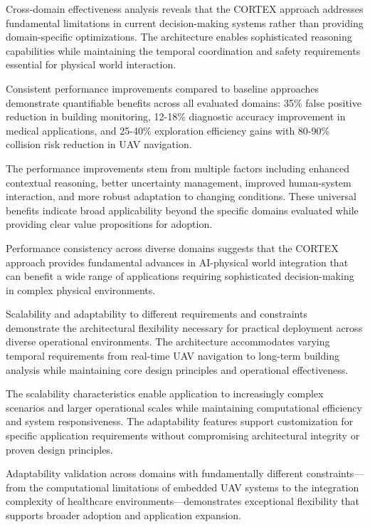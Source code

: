 Cross-domain effectiveness analysis reveals that the CORTEX approach addresses fundamental limitations in current decision-making systems rather than providing domain-specific optimizations. The architecture enables sophisticated reasoning capabilities while maintaining the temporal coordination and safety requirements essential for physical world interaction.

Consistent performance improvements compared to baseline approaches demonstrate quantifiable benefits across all evaluated domains: 35\% false positive reduction in building monitoring, 12-18\% diagnostic accuracy improvement in medical applications, and 25-40\% exploration efficiency gains with 80-90\% collision risk reduction in UAV navigation.

The performance improvements stem from multiple factors including enhanced contextual reasoning, better uncertainty management, improved human-system interaction, and more robust adaptation to changing conditions. These universal benefits indicate broad applicability beyond the specific domains evaluated while providing clear value propositions for adoption.

Performance consistency across diverse domains suggests that the CORTEX approach provides fundamental advances in AI-physical world integration that can benefit a wide range of applications requiring sophisticated decision-making in complex physical environments.

Scalability and adaptability to different requirements and constraints demonstrate the architectural flexibility necessary for practical deployment across diverse operational environments. The architecture accommodates varying temporal requirements from real-time UAV navigation to long-term building analysis while maintaining core design principles and operational effectiveness.

The scalability characteristics enable application to increasingly complex scenarios and larger operational scales while maintaining computational efficiency and system responsiveness. The adaptability features support customization for specific application requirements without compromising architectural integrity or proven design principles.

Adaptability validation across domains with fundamentally different constraints—from the computational limitations of embedded UAV systems to the integration complexity of healthcare environments—demonstrates exceptional flexibility that supports broader adoption and application expansion.

